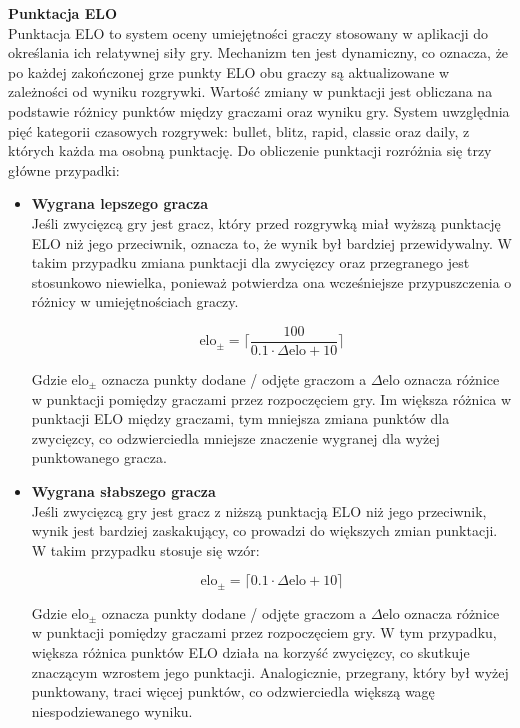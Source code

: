 \documentclass[12pt,a4paper]{article}
\begin{document}
\newpage

\noindent \textbf{Punktacja ELO}\\
Punktacja ELO to system oceny umiejętności graczy stosowany w aplikacji do określania ich relatywnej siły gry. Mechanizm ten jest dynamiczny, co oznacza, że po każdej zakończonej grze punkty ELO obu graczy są aktualizowane w zależności od wyniku rozgrywki. Wartość zmiany w punktacji jest obliczana na podstawie różnicy punktów między graczami oraz wyniku gry. System uwzględnia pięć kategorii czasowych rozgrywek: bullet, blitz, rapid, classic oraz daily, z których każda ma osobną punktację. Do obliczenie punktacji rozróżnia się trzy główne przypadki:

\begin{itemize}
    \item \textbf{Wygrana lepszego gracza}\\
    Jeśli zwycięzcą gry jest gracz, który przed rozgrywką miał wyższą punktację ELO niż jego przeciwnik, oznacza to, że wynik był bardziej przewidywalny. W takim przypadku zmiana punktacji dla zwycięzcy oraz przegranego jest stosunkowo niewielka, ponieważ potwierdza ona wcześniejsze przypuszczenia o różnicy w umiejętnościach graczy.

    \[ \text{elo}_{\pm} = \lceil \frac{100}{0.1 \cdot \Delta \text{elo} + 10} \rceil \]

    Gdzie $ \text{elo}_{\pm} $ oznacza punkty dodane / odjęte graczom a $ \Delta \text{elo} $ oznacza różnice w punktacji pomiędzy graczami przez rozpoczęciem gry. Im większa różnica w punktacji ELO między graczami, tym mniejsza zmiana punktów dla zwycięzcy, co odzwierciedla mniejsze znaczenie wygranej dla wyżej punktowanego gracza.
    \item \textbf{Wygrana słabszego gracza}\\
    Jeśli zwycięzcą gry jest gracz z niższą punktacją ELO niż jego przeciwnik, wynik jest bardziej zaskakujący, co prowadzi do większych zmian punktacji. W takim przypadku stosuje się wzór:

    \[ \text{elo}_{\pm} = \lceil 0.1 \cdot \Delta \text{elo} + 10 \rceil \]

    Gdzie $ \text{elo}_{\pm} $ oznacza punkty dodane / odjęte graczom a $ \Delta \text{elo} $ oznacza różnice w punktacji pomiędzy graczami przez rozpoczęciem gry. W tym przypadku, większa różnica punktów ELO działa na korzyść zwycięzcy, co skutkuje znaczącym wzrostem jego punktacji. Analogicznie, przegrany, który był wyżej punktowany, traci więcej punktów, co odzwierciedla większą wagę niespodziewanego wyniku.


\end{itemize}
\end{document}
